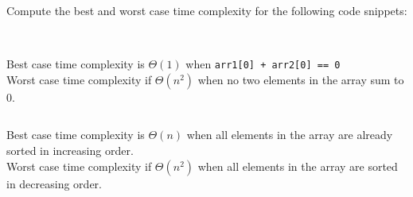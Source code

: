 \begin{prob}
    Compute the best and worst case time complexity for the following code snippets:

    \begin{subprobset}

        \begin{subprob}
            \inputminted{python}{\thisdir/include/part_a.py}
        \end{subprob}

        \begin{soln} 
            \\
            Best case time complexity is $\Theta(1)$ when \texttt{arr1[0] + arr2[0] == 0}
            \\
            Worst case time complexity if $\Theta(n^2)$ when no two elements in the array sum to 0.

        \end{soln}

        \begin{subprob}
            \inputminted{python}{\thisdir/include/part_b.py}
        \end{subprob}

        \begin{soln}
        
            Best case time complexity is $\Theta(n)$ when all elements in the array are already sorted in increasing order.
            \\
            Worst case time complexity if $\Theta(n^2)$ when all elements in the array are sorted in decreasing order.

        \end{soln}

    \end{subprobset}

\end{prob}
